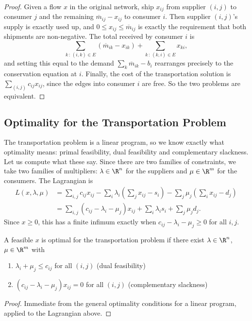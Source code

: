 \begin{proof}
    Given a flow $x$ in the original network, ship $x_{ij}$ from supplier $(i,j)$ to consumer $j$ and the remaining $\overline m_{ij} - x_{ij}$ to consumer $i$. Then supplier $(i,j)$'s supply is exactly used up, and $0 \leq x_{ij} \leq \overline m_{ij}$ is exactly the requirement that both shipments are non-negative. The total received by consumer $i$ is
    $$
    \sum_{k\,:\,(i,k)\in E}(\overline m_{ik} - x_{ik}) + \sum_{k\,:\,(k,i)\in E}x_{ki},
    $$
    and setting this equal to the demand $\sum_k \overline m_{ik} - b_i$ rearranges precisely to the conservation equation at $i$. Finally, the cost of the transportation solution is $\sum_{(i,j)}c_{ij}x_{ij}$, since the edges into consumer $i$ are free. So the two problems are equivalent.
\end{proof}

\subsection{Optimality for the Transportation Problem}

The transportation problem is a linear program, so we know exactly what optimality means: primal feasibility, dual feasibility and complementary slackness. Let us compute what these say. Since there are two families of constraints, we take two families of multipliers: $\lambda \in \R^n$ for the suppliers and $\mu \in \R^m$ for the consumers. The Lagrangian is
\begin{align*}
    L(x,\lambda,\mu) &= \sum_{i,j}c_{ij}x_{ij} - \sum_{i}\lambda_i\left(\sum_j x_{ij} - s_i\right) - \sum_j\mu_j\left(\sum_i x_{ij} - d_j\right)\\
    &= \sum_{i,j}\left(c_{ij} - \lambda_i - \mu_j\right)x_{ij} + \sum_i\lambda_i s_i + \sum_j\mu_j d_j.
\end{align*}
Since $x \geq 0$, this has a finite infimum exactly when $c_{ij} - \lambda_i - \mu_j \geq 0$ for all $i,j$.

\begin{theorem}
    A feasible $x$ is optimal for the transportation problem if there exist $\lambda \in \R^n$, $\mu \in \R^m$ with
    \begin{enumerate}[label=(\roman*)]
        \item $\lambda_i + \mu_j \leq c_{ij}$ for all $(i,j)$ \hfill (dual feasibility)
        \item $\left(c_{ij} - \lambda_i - \mu_j\right)x_{ij} = 0$ for all $(i,j)$ \hfill (complementary slackness)
    \end{enumerate}
\end{theorem}
\begin{proof}
    Immediate from the general optimality conditions for a linear program, applied to the Lagrangian above.
\end{proof}

